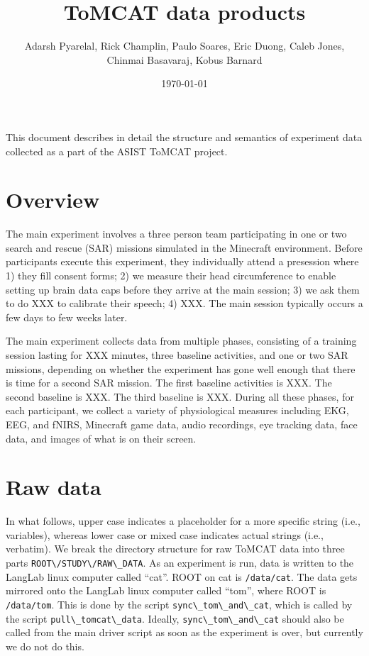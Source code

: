 \documentclass[12pt,letterpaper,oneside,openany]{article}
\title{ToMCAT data products}
\author{Adarsh Pyarelal, Rick Champlin, Paulo Soares, Eric Duong, Caleb
Jones, Chinmai Basavaraj, Kobus Barnard}
\date{\today}
\newcommand{\code}[1]{\lstinline{#1}}
\begin{document}
\maketitle
\setcounter{page}{2}


This document describes in detail the structure and semantics of experiment data
collected as a part of the ASIST ToMCAT project. 


\section{Overview}

The main experiment involves a three person team participating in one or two
search and rescue (SAR) missions simulated in the Minecraft environment. 
Before participants execute this experiment, they individually attend a
presession where 1) they fill consent forms; 2) we measure their head circumference to enable setting up brain data caps
before they arrive at the main session; 3) we ask them to do XXX to calibrate
their speech; 4) XXX. The main session typically occurs a few days to few weeks
later. 

The main experiment collects data from multiple phases, consisting of a training
session lasting for XXX minutes, three baseline activities, and one or two SAR
missions, depending on whether the experiment has gone well enough that there is
time for a second SAR mission.  The first baseline activities is XXX. The second
baseline is XXX.  The third baseline is XXX.  During all these phases, for each
participant, we collect a variety of physiological measures including EKG, EEG,
and fNIRS, Minecraft game data, audio recordings, eye tracking data, face data,
and images of what is on their screen. 

\section{Raw data}

In what follows, upper case indicates
a placeholder for a more specific string (i.e., variables), whereas lower case or mixed case
indicates actual strings (i.e., verbatim).
We break the directory structure for raw ToMCAT data into three parts
\code{ROOT\/STUDY\/RAW\_DATA}. 
As an experiment is run, data is written to the LangLab linux computer called
``cat''. ROOT on cat is
\code{/data/cat}. The data gets mirrored onto the LangLab linux computer called
``tom'', where ROOT is \code{/data/tom}. 
This is done by the script \code{sync\_tom\_and\_cat}, which is called by the script 
\code{pull\_tomcat\_data}. Ideally, \code{sync\_tom\_and\_cat} should also be
called from the main driver script as soon as the experiment is over, but
currently we do not do this. 
\end{document}
